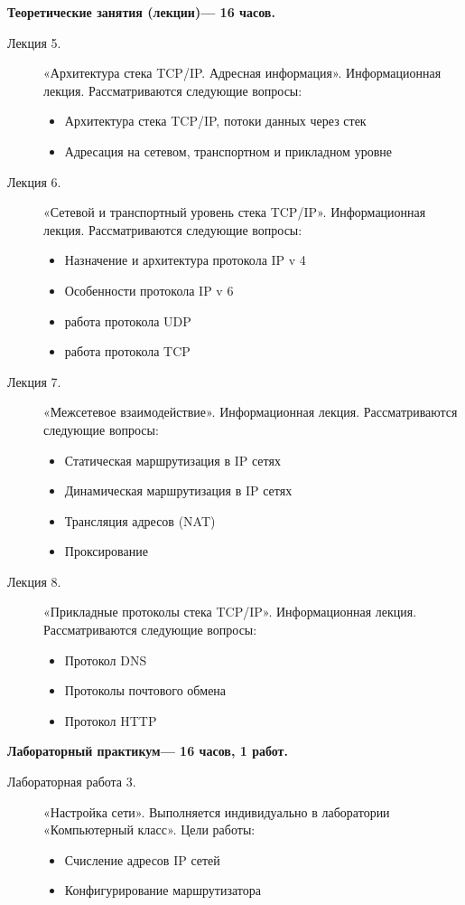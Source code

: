 \begin{center}
{\parindent0pt

\textbf{Теоретические занятия (лекции)— 16 часов.}
\begin{description}
\item[Лекция 5.] «Архитектура стека TCP/IP. Адресная информация». Информационная лекция. Рассматриваются следующие вопросы: \begin{itemize}
\item Архитектура стека TCP/IP, потоки данных через стек\item Адресация на сетевом, транспортном и прикладном уровне
\end{itemize}\item[Лекция 6.] «Сетевой и транспортный уровень стека TCP/IP». Информационная лекция. Рассматриваются следующие вопросы: \begin{itemize}
\item Назначение и архитектура протокола IP v 4\item Особенности протокола IP v 6\item работа протокола UDP\item работа протокола TCP
\end{itemize}\item[Лекция 7.] «Межсетевое взаимодействие». Информационная лекция. Рассматриваются следующие вопросы: \begin{itemize}
\item Статическая маршрутизация в IP сетях\item Динамическая маршрутизация в IP сетях\item Трансляция адресов (NAT)\item Проксирование
\end{itemize}\item[Лекция 8.] «Прикладные протоколы стека TCP/IP». Информационная лекция. Рассматриваются следующие вопросы: \begin{itemize}
\item Протокол DNS\item Протоколы почтового обмена\item Протокол HTTP
\end{itemize}
\end{description}




\textbf{Лабораторный практикум— 16 часов, 1 работ.}
\begin{description}
\item[Лабораторная работа 3.] «Настройка сети». Выполняется индивидуально в лаборатории «Компьютерный класс». Цели работы: \begin{itemize}
\item Счисление адресов IP сетей\item Конфигурирование маршрутизатора
\end{itemize}
\end{description}

}
\end{center}
